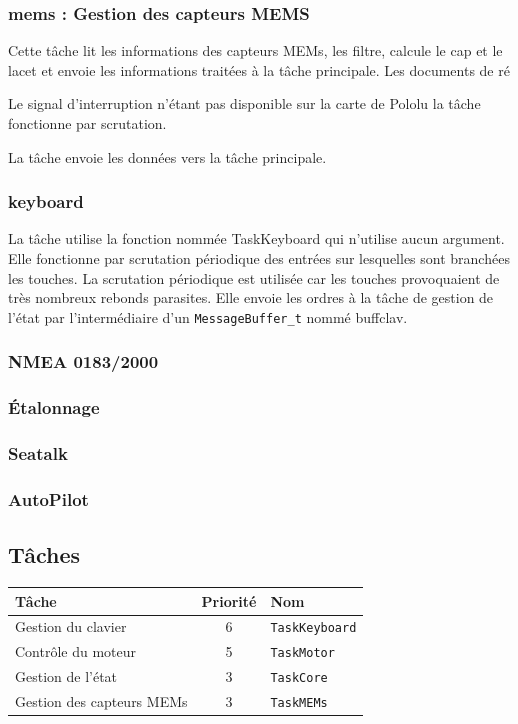\documentclass[a4paper,11pt]{report}
\begin{document}
\subsubsection{mems : Gestion des capteurs MEMS}
Cette tâche lit les informations des capteurs MEMs, les filtre,
calcule le cap et le lacet et envoie les informations traitées à la tâche principale.
Les documents de ré

Le signal d'interruption n'étant pas disponible sur la carte de Pololu
la tâche fonctionne par scrutation.

La tâche envoie les données vers la tâche principale.

\subsubsection{keyboard}
La tâche utilise la fonction nommée TaskKeyboard qui n'utilise aucun argument.
Elle fonctionne par scrutation périodique des entrées sur lesquelles sont branchées les touches.
La scrutation périodique est utilisée car les touches provoquaient de très nombreux
rebonds parasites. 
Elle envoie les ordres à la tâche de gestion de l'état
par l'intermédiaire d'un \texttt{MessageBuffer\_t} nommé buffclav.
\subsubsection{NMEA 0183/2000}
\subsubsection{Étalonnage}
\subsubsection{Seatalk}
\subsubsection{AutoPilot}
\subsection{Tâches}
\begin{tabular}{|l|c|l|}
\hline 
Tâche & Priorité & Nom \\
\hline 
Gestion du clavier & 6 & \texttt{TaskKeyboard}\\
Contrôle du moteur & 5 & \texttt{TaskMotor}\\
Gestion de l'état & 3 & \texttt{TaskCore}\\
Gestion des capteurs MEMs & 3 & \texttt{TaskMEMs}\\
\hline
\end{tabular} 
\end{document}

